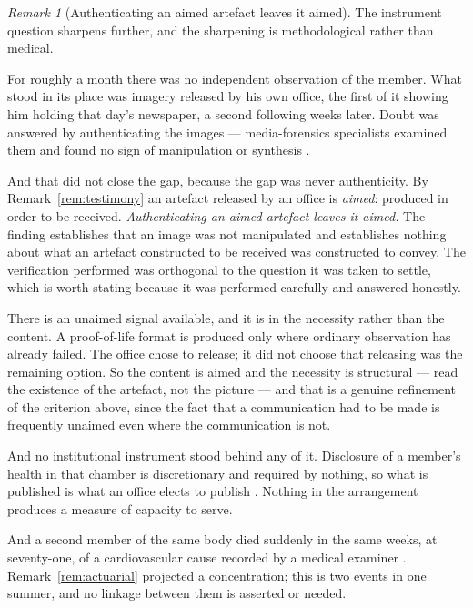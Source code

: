 \documentclass[11pt,a4paper]{article}
\theoremstyle{remark}
\newtheorem{remark}[definition]{Remark}
\begin{document}
\begin{remark}[Authenticating an aimed artefact leaves it aimed]\label{rem:proof}
The instrument question sharpens further, and the sharpening is methodological rather than medical.

For roughly a month there was no independent observation of the member. What stood in its place
was imagery released by his own office, the first of it showing him holding that day's newspaper, a
second following weeks later. Doubt was answered by authenticating the images --- media-forensics
specialists examined them and found no sign of manipulation or synthesis \citep{proof2026,proof2026b}.

And that did not close the gap, because the gap was never authenticity. By
Remark~\ref{rem:testimony} an artefact released by an office is \emph{aimed}: produced in order to be
received. \emph{Authenticating an aimed artefact leaves it aimed.} The finding establishes that an image
was not manipulated and establishes nothing about what an artefact constructed to be received was
constructed to convey. The verification performed was orthogonal to the question it was taken to
settle, which is worth stating because it was performed carefully and answered honestly.

There is an unaimed signal available, and it is in the necessity rather than the content. A
proof-of-life format is produced only where ordinary observation has already failed. The office chose to
release; it did not choose that releasing was the remaining option. So the content is aimed and
the necessity is structural --- read the existence of the artefact, not the picture --- and that
is a genuine refinement of the criterion above, since the fact that a communication had to be made is
frequently unaimed even where the communication is not.

And no institutional instrument stood behind any of it. Disclosure of a member's health in that
chamber is discretionary and required by nothing, so what is published is what an office elects to
publish \citep{health2026}. Nothing in the arrangement produces a measure of capacity to serve.

And a second member of the same body died suddenly in the same weeks, at seventy-one, of a
cardiovascular cause recorded by a medical examiner \citep{graham2026}. Remark~\ref{rem:actuarial} projected a
concentration; this is two events in one summer, and no linkage between them is asserted or
needed.
\end{remark}
\end{document}
